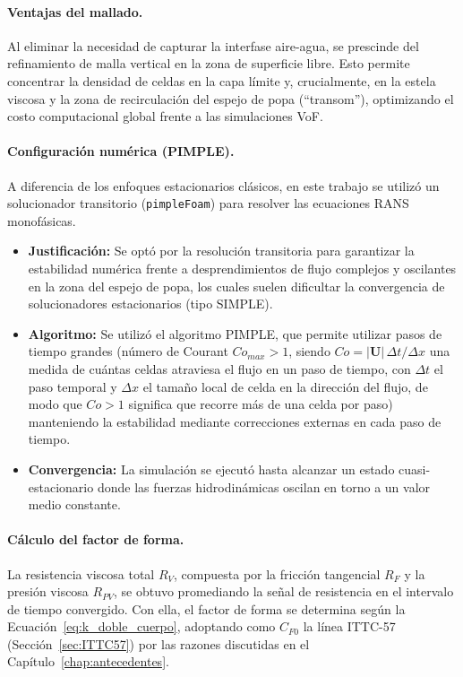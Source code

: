 \paragraph{Ventajas del mallado.}
Al eliminar la necesidad de capturar la interfase aire-agua, se prescinde del refinamiento de malla vertical en la zona de superficie libre. Esto permite concentrar la densidad de celdas en la capa límite y, crucialmente, en la estela viscosa y la zona de recirculación del espejo de popa (``transom''), optimizando el costo computacional global frente a las simulaciones VoF.

\paragraph{Configuración numérica (PIMPLE).}
A diferencia de los enfoques estacionarios clásicos, en este trabajo se utilizó un solucionador transitorio (\texttt{pimpleFoam}) para resolver las ecuaciones RANS monofásicas.
\begin{itemize}
    \item \textbf{Justificación:} Se optó por la resolución transitoria para garantizar la estabilidad numérica frente a desprendimientos de flujo complejos y oscilantes en la zona del espejo de popa, los cuales suelen dificultar la convergencia de solucionadores estacionarios (tipo SIMPLE).
    \item \textbf{Algoritmo:} Se utilizó el algoritmo PIMPLE, que permite utilizar pasos de tiempo grandes (número de Courant $Co_{max} > 1$, siendo $Co = |\mathbf{U}|\,\Delta t/\Delta x$ una medida de cuántas celdas atraviesa el flujo en un paso de tiempo, con $\Delta t$ el paso temporal y $\Delta x$ el tamaño local de celda en la dirección del flujo, de modo que $Co > 1$ significa que recorre más de una celda por paso) manteniendo la estabilidad mediante correcciones externas en cada paso de tiempo.
    \item \textbf{Convergencia:} La simulación se ejecutó hasta alcanzar un estado cuasi-estacionario donde las fuerzas hidrodinámicas oscilan en torno a un valor medio constante.
\end{itemize}

\paragraph{Cálculo del factor de forma.}
La resistencia viscosa total $R_V$, compuesta por la fricción tangencial $R_F$
y la presión viscosa $R_{PV}$, se obtuvo promediando la señal de resistencia
en el intervalo de tiempo convergido. Con ella, el factor de forma se determina
según la Ecuación~\eqref{eq:k_doble_cuerpo}, adoptando como $C_{F0}$ la línea
ITTC-57 (Sección~\ref{sec:ITTC57}) por las razones discutidas en el
Capítulo~\ref{chap:antecedentes}.

